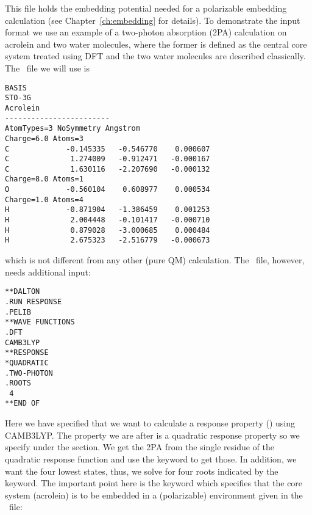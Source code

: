 This file holds the embedding potential needed for a polarizable embedding
calculation (see Chapter~\ref{ch:embedding} for details). To demonstrate the
input format we use an example of a two-photon absorption (2PA) calculation
on acrolein and two water molecules, where the former is defined as the central core system treated using DFT and the two water molecules are described classically. The \molinp\ file we will use is
\begin{verbatim}
BASIS
STO-3G
Acrolein
------------------------
AtomTypes=3 NoSymmetry Angstrom
Charge=6.0 Atoms=3
C             -0.145335   -0.546770    0.000607
C              1.274009   -0.912471   -0.000167
C              1.630116   -2.207690   -0.000132
Charge=8.0 Atoms=1
O             -0.560104    0.608977    0.000534
Charge=1.0 Atoms=4
H             -0.871904   -1.386459    0.001253
H              2.004448   -0.101417   -0.000710
H              0.879028   -3.000685    0.000484
H              2.675323   -2.516779   -0.000673
\end{verbatim}
which is not different from any other (pure QM) calculation. The \dalinp\ file, however, needs additional input:
\begin{verbatim}
**DALTON
.RUN RESPONSE
.PELIB
**WAVE FUNCTIONS
.DFT
CAMB3LYP
**RESPONSE
*QUADRATIC
.TWO-PHOTON
.ROOTS
 4
**END OF
\end{verbatim}
Here we have specified that we want to calculate a response property 
() using CAMB3LYP. The property we are after is a quadratic 
response property so we specify  under the  
section. We get the 2PA from the single residue of the quadratic response 
function and use the  keyword to get those. In addition, we 
want the four lowest states, thus, we solve for four roots indicated by the 
 keyword. The important point here is the  keyword which 
specifies that the core system (acrolein) is to be embedded in a (polarizable) environment given in the \potinp\ file:
